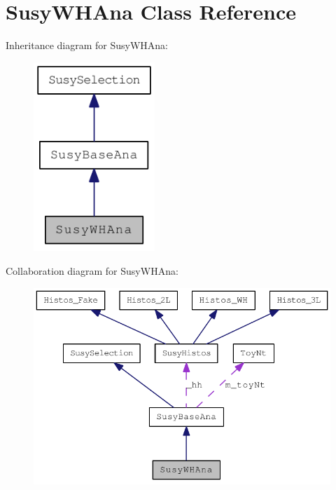 \hypertarget{classSusyWHAna}{
\section{SusyWHAna Class Reference}
\label{classSusyWHAna}
}
Inheritance diagram for SusyWHAna:\nopagebreak
\begin{figure}[H]
\begin{center}
\leavevmode
\includegraphics[width=130pt]{classSusyWHAna__inherit__graph}
\end{center}
\end{figure}
Collaboration diagram for SusyWHAna:\nopagebreak
\begin{figure}[H]
\begin{center}
\leavevmode
\includegraphics[width=372pt]{classSusyWHAna__coll__graph}
\end{center}
\end{figure}
